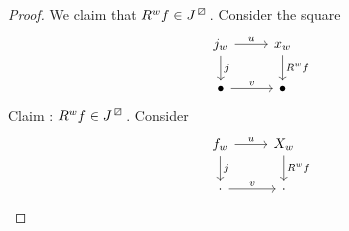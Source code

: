\begin{proof}
    We claim that $R^wf \in J^{\lift{}}$.
    Consider the square 
    \[
    \begin{tikzcd}
        j_w
        \ar[r,"u"]
        \ar[d,"j"]
        &
        x_w
        \ar[d, "R^wf"]
        \\
        \bullet 
        \ar[r,"v"]
        &
        \bullet
    \end{tikzcd}
    \]
    Claim : $ R^w f \in J^{\lift{}} $.
    Consider 
    \[
    \begin{tikzcd}
        f_w 
        \ar[r , " u "]
        \ar[d, "j"]
        &
        X_w
        \ar[d, "R^w f "]
        \\
        \cdot
        \ar[r, " v"]
        &
        \cdot
    \end{tikzcd}
    \]
\end{proof}